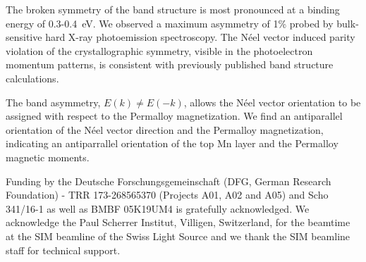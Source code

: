 \documentclass[aps,prb,twocolumn,superscriptaddress,10pt]{revtex4-1}
\begin{document}
The broken symmetry of the band structure is most pronounced at a binding energy of 0.3-0.4~eV.
We observed a maximum asymmetry of 1\% probed by bulk-sensitive hard X-ray photoemission spectroscopy.
The N{\'e}el vector induced parity violation of the crystallographic symmetry, visible in the photoelectron momentum patterns, is consistent with 
previously published band structure calculations. 

The band asymmetry, $E(k) \neq E(-k)$, allows the
N{\'e}el vector orientation to be assigned with respect to the Permalloy magnetization. 
We find an antiparallel orientation of the 
N{\'e}el vector direction and the Permalloy magnetization,
indicating an antiparrallel orientation of the top Mn layer and the
Permalloy magnetic moments.

\begin{acknowledgments} 
Funding by the Deutsche Forschungsgemeinschaft (DFG, German Research Foundation) - TRR 173-268565370 (Projects A01, A02 and A05) 
and Scho 341/16-1 as well as BMBF 05K19UM4
is gratefully acknowledged. 
We acknowledge the Paul Scherrer Institut, Villigen, Switzerland, for the beamtime at the SIM beamline of the Swiss Light Source and we thank the SIM beamline staff for technical support.
\end{acknowledgments}


\end{document}
